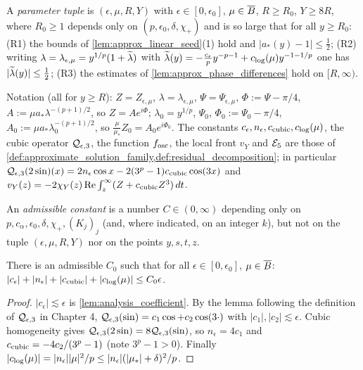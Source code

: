 \begin{definition}
  A \emph{parameter tuple} is $(\epsilon,\mu,R,Y)$ with $\epsilon\in[0,\epsilon_0]$, $\mu\in\overline{B}$,
  $R\ge R_0$, $Y\ge8R$, where $R_0\ge1$ depends only on $(p,\epsilon_0,\delta,\chi_+)$ and is so large that
  for all $y\ge R_0$: (R1) the bounds of \cref{lem:approx_linear_seed}(1) hold and $|a_*(y)-1|\le\frac12$;
  (R2) writing $\lambda=\lambda_{\epsilon,\mu}=y^{1/p}(1+\widetilde{\lambda})$ with
  $\widetilde{\lambda}(y)=-\frac{c_\epsilon}{p}y^{-p-1}+c_{\textup{log}}(\mu)y^{-1-1/p}$ one has $|\widetilde{\lambda}(y)|\le\frac12$;
  (R3) the estimates of \cref{lem:approx_phase_differences} hold on $[R,\infty)$.

  Notation (all for $y\ge R$): $Z=Z_{\epsilon,\mu}$, $\lambda=\lambda_{\epsilon,\mu}$, $\Psi=\Psi_{\epsilon,\mu}$,
  $\Phi:=\Psi-\pi/4$, $A:=\mu a_*\lambda^{-(p+1)/2}$, so $Z=Ae^{i\Phi}$; $\lambda_0=y^{1/p}$, $\Psi_0$,
  $\Phi_0:=\Psi_0-\pi/4$, $A_0:=\mu a_*\lambda_0^{-(p+1)/2}$, so $\frac{\mu}{\mu_*}Z_0=A_0e^{i\Phi_0}$.
  The constants $c_\epsilon,n_\epsilon,c_{\textup{cubic}},c_{\textup{log}}(\mu)$, the cubic operator
  $\mathcal{Q}_{\epsilon,3}$, the function $f_{\textup{osc}}$, the local front $v_Y$ and $\mathcal{E}_5$ are those of
  \cref{def:approximate_solution_family,def:residual_decomposition}; in particular
  $\mathcal{Q}_{\epsilon,3}(2\sin)(x)=2n_\epsilon\cos x-2(3^p-1)c_{\textup{cubic}}\cos(3x)$ and
  $v_Y(z)=-2\chi_Y(z)\operatorname{Re}\int_z^\infty(Z+c_{\textup{cubic}}Z^3)\,dt$.

  An \emph{admissible constant} is a number $C\in(0,\infty)$ depending only on
  $p,c_\alpha,\epsilon_0,\delta,\chi_+,(K_j)_j$ (and, where indicated, on an integer $k$), but not on the
  tuple $(\epsilon,\mu,R,Y)$ nor on the points $y,s,t,z$.
\end{definition}

\begin{lemma}
  \label{lem:c05_small_constants}
  There is an admissible $C_0$ such that for all $\epsilon\in[0,\epsilon_0]$, $\mu\in\overline{B}$:
  $|c_\epsilon|+|n_\epsilon|+|c_{\textup{cubic}}|+|c_{\textup{log}}(\mu)|\le C_0\epsilon$.
\end{lemma}
\begin{proof}
  $|c_\epsilon|\lesssim\epsilon$ is \cref{lem:analysis_coefficient}. By the lemma following the definition
  of $\mathcal{Q}_{\epsilon,3}$ in Chapter 4, $\mathcal{Q}_{\epsilon,3}(\sin)=c_1\cos+c_2\cos(3\cdot)$ with
  $|c_1|,|c_2|\lesssim\epsilon$. Cubic homogeneity gives $\mathcal{Q}_{\epsilon,3}(2\sin)=8\mathcal{Q}_{\epsilon,3}(\sin)$,
  so $n_\epsilon=4c_1$ and $c_{\textup{cubic}}=-4c_2/(3^p-1)$ (note $3^p-1>0$). Finally
  $|c_{\textup{log}}(\mu)|=|n_\epsilon||\mu|^2/p\le|n_\epsilon|(|\mu_*|+\delta)^2/p$.
\end{proof}

